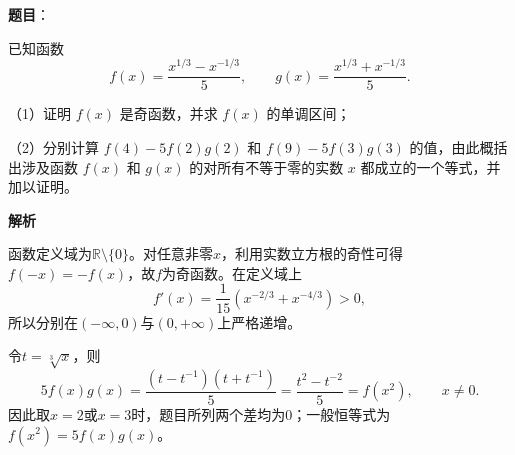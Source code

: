 \begin{answer}

\textbf{题目}：

已知函数
\nopagebreak[4]
\[
f(x)=\dfrac{x^{1/3}-x^{-1/3}}{5},\qquad
g(x)=\dfrac{x^{1/3}+x^{-1/3}}{5}.
\]

（1）证明 $f(x)$ 是奇函数，并求 $f(x)$ 的单调区间；

（2）分别计算 $f(4)-5f(2)g(2)$ 和 $f(9)-5f(3)g(3)$ 的值，由此概括出涉及函数 $f(x)$ 和 $g(x)$ 的对所有不等于零的实数 $x$ 都成立的一个等式，并加以证明。

\textbf{解析}

函数定义域为$\mathbb R\setminus\{0\}$。对任意非零$x$，利用实数立方根的奇性可得$f(-x)=-f(x)$，故$f$为奇函数。在定义域上
\nopagebreak[4]
\[
f'(x)=\frac1{15}\left(x^{-2/3}+x^{-4/3}\right)>0,
\]
所以分别在$(-\infty,0)$与$(0,+\infty)$上严格递增。

令$t=\sqrt[3]{x}$，则
\nopagebreak[4]
\[
5f(x)g(x)=\frac{(t-t^{-1})(t+t^{-1})}{5}
=\frac{t^2-t^{-2}}5=f(x^2),\qquad x\ne0.
\]
因此取$x=2$或$x=3$时，题目所列两个差均为0；一般恒等式为$f(x^2)=5f(x)g(x)$。


\end{answer}

